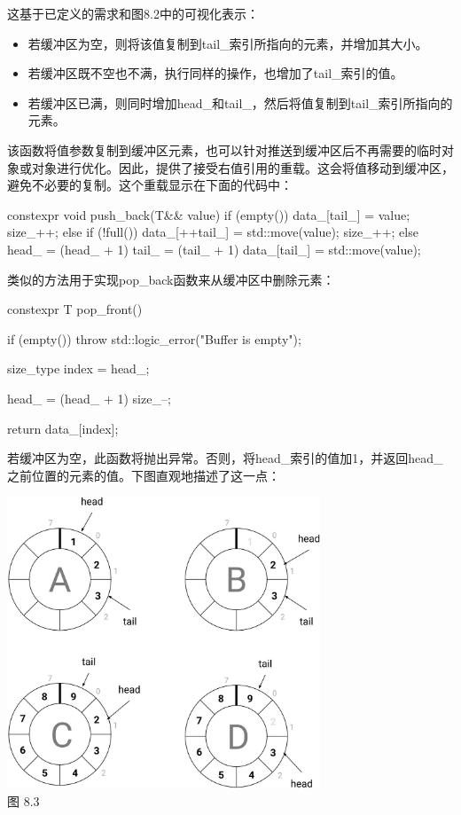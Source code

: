 这基于已定义的需求和图8.2中的可视化表示：

\begin{itemize}
  \item 若缓冲区为空，则将该值复制到tail\_索引所指向的元素，并增加其大小。
  \item 若缓冲区既不空也不满，执行同样的操作，也增加了tail\_索引的值。
  \item 若缓冲区已满，则同时增加head\_和tail\_，然后将值复制到tail\_索引所指向的元素。
\end{itemize}

该函数将值参数复制到缓冲区元素，也可以针对推送到缓冲区后不再需要的临时对象或对象进行优化。因此，提供了接受右值引用的重载。这会将值移动到缓冲区，避免不必要的复制。这个重载显示在下面的代码中：

\begin{cpp}
constexpr void push_back(T&& value)
{
	if (empty())
	{
		data_[tail_] = value;
		size_++;
	}
	else if (!full())
	{
		data_[++tail_] = std::move(value);
		size_++;
	}
	else
	{
	head_ = (head_ + 1) %
	tail_ = (tail_ + 1) %
	data_[tail_] = std::move(value);
	}
}
\end{cpp}

类似的方法用于实现pop\_back函数来从缓冲区中删除元素：

\begin{cpp}
constexpr T pop_front()
{
	if (empty()) throw std::logic_error("Buffer is empty");
	
	size_type index = head_;
	
	head_ = (head_ + 1) %
	size_--;
	
	return data_[index];
}
\end{cpp}

若缓冲区为空，此函数将抛出异常。否则，将head\_索引的值加1，并返回head\_之前位置的元素的值。下图直观地描述了这一点：

\begin{center}
\includegraphics[width=0.7\textwidth]{images/3.png}\\
图 8.3
\end{center}

